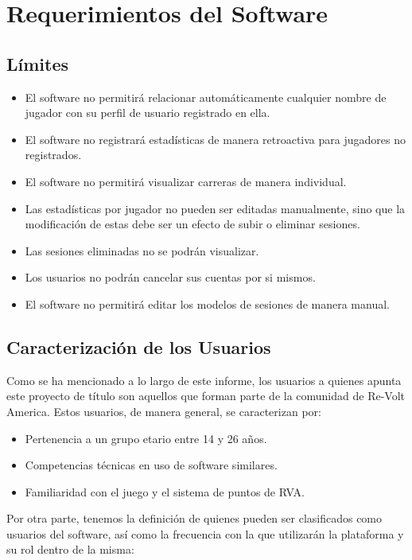 \chapter{Requerimientos del Software}

\section{Límites}

\begin{itemize}
	\item El software no permitirá relacionar automáticamente cualquier nombre de jugador con su perfil de usuario registrado en ella.
	\item El software no registrará estadísticas de manera retroactiva para jugadores no registrados.
	\item El software no permitirá visualizar carreras de manera individual.
	\item Las estadísticas por jugador no pueden ser editadas manualmente, sino que la modificación de estas debe ser un efecto de subir o eliminar sesiones.
	\item Las sesiones eliminadas no se podrán visualizar.
	\item Los usuarios no podrán cancelar sus cuentas por si mismos.
	\item El software no permitirá editar los modelos de sesiones de manera manual.
\end{itemize}

\section{Caracterización de los Usuarios}
Como se ha mencionado a lo largo de este informe, los usuarios a quienes apunta este proyecto de título son aquellos que forman parte de la comunidad de Re-Volt America. Estos usuarios, de manera general, se caracterizan por:

\begin{itemize}
	\item Pertenencia a un grupo etario entre 14 y 26 años.
	\item Competencias técnicas en uso de software similares.
	\item Familiaridad con el juego y el sistema  de puntos de RVA.
\end{itemize}

Por otra parte, tenemos la definición de quienes pueden ser clasificados como usuarios del software, así como la frecuencia con la que utilizarán la plataforma y su rol dentro de la misma:

